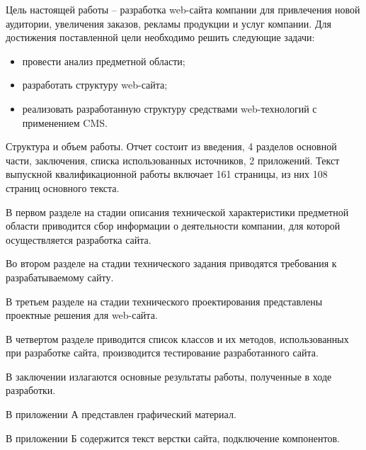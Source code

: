 Цель настоящей работы – разработка web-сайта компании для привлечения новой аудитории, увеличения заказов, рекламы продукции и услуг компании. Для достижения поставленной цели необходимо решить следующие задачи:
\begin{itemize}
\item провести анализ предметной области;
\item разработать структуру web-сайта;
\item реализовать разработанную структуру средствами web-технологий с \linebreak применением CMS.
\end{itemize}

Структура и объем работы. Отчет состоит из введения, 4 разделов основной части, заключения, списка использованных источников, 2 приложений. Текст выпускной квалификационной работы включает 161 страницы, из них 108 страниц основного текста.

В первом разделе на стадии описания технической характеристики предметной области приводится сбор информации о деятельности компании, для которой осуществляется разработка сайта.

Во втором разделе на стадии технического задания приводятся требования к разрабатываемому сайту.

В третьем разделе на стадии технического проектирования представлены проектные решения для web-сайта.

В четвертом разделе приводится список классов и их методов, использованных при разработке сайта, производится тестирование разработанного сайта.

В заключении излагаются основные результаты работы, полученные в ходе разработки.

В приложении А представлен графический материал.

В приложении Б содержится текст верстки сайта, подключение компонентов. 
